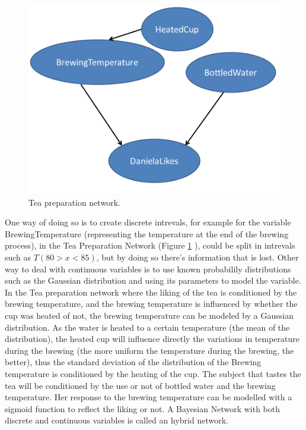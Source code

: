 \begin{figure}[h]
\centering 

\includegraphics[scale=0.35]{Overview/Figures/TeaPreparationNetwork.png}
\caption{Tea preparation network.}
\label{fig:tea_network}
\end{figure}

One way of doing so is to create discrete intrevals, for example for the variable BrewingTemperature (representing the temperature at the end of the brewing process), in the Tea Preparation Network (Figure \ref{fig:tea_network} ), could be split in intrevals such as $T(80 > x< 85)$, but by doing so there's information that is lost.  
Other way to deal with continuous variables is to use known probabilily distributions such as the Gaussian distribution and using its parameters to model the variable. 
In the Tea preparation network where the liking of the tea is conditioned by the brewing temperature, and the brewing temperature is influenced by whether the cup was heated of not, the brewing temperature can be modeled by a Gaussian distribution. As the water is heated to a certain temperature (the mean of the distribution), the heated cup will influence directly the variations in temperature during the brewing (the more uniform the temperature during the brewing, the better), thus the standard deviation of the distribution of the Brewing temperature is conditioned by the heating of the cup.
The subject that tastes the tea will be conditioned by the use or not of bottled water and the brewing temperature. Her response to the brewing temperature can be modelled with a sigmoid function to reflect the liking or not.
A Bayesian Network with both discrete and continuous variables is called an hybrid network.


